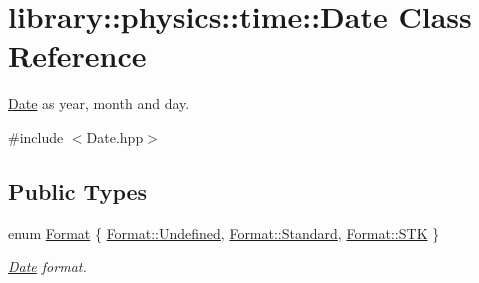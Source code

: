 \hypertarget{classlibrary_1_1physics_1_1time_1_1_date}{}\section{library\+:\+:physics\+:\+:time\+:\+:Date Class Reference}
\label{classlibrary_1_1physics_1_1time_1_1_date}


\hyperlink{classlibrary_1_1physics_1_1time_1_1_date}{Date} as year, month and day.  




{\ttfamily \#include $<$Date.\+hpp$>$}

\subsection*{Public Types}
\begin{DoxyCompactItemize}
\item 
enum \hyperlink{classlibrary_1_1physics_1_1time_1_1_date_a97671e22ec7b7825cf99ead6d86d0bf7}{Format} \{ \hyperlink{classlibrary_1_1physics_1_1time_1_1_date_a97671e22ec7b7825cf99ead6d86d0bf7aec0fc0100c4fc1ce4eea230c3dc10360}{Format\+::\+Undefined}, 
\hyperlink{classlibrary_1_1physics_1_1time_1_1_date_a97671e22ec7b7825cf99ead6d86d0bf7aeb6d8ae6f20283755b339c0dc273988b}{Format\+::\+Standard}, 
\hyperlink{classlibrary_1_1physics_1_1time_1_1_date_a97671e22ec7b7825cf99ead6d86d0bf7a9c3581080a26f47bbe0746a2d9b7cf2c}{Format\+::\+S\+TK}
 \}\begin{DoxyCompactList}\small\item\em \hyperlink{classlibrary_1_1physics_1_1time_1_1_date}{Date} format. \end{DoxyCompactList}
\end{DoxyCompactItemize}
